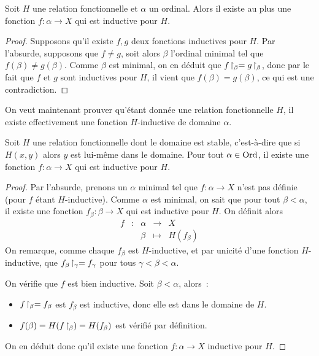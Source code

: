 \begin{lemma}
  Soit $H$ une relation fonctionnelle et $\alpha$ un ordinal. Alors il existe
  au plus une fonction $f : \alpha \to X$ qui est inductive pour $H$.
\end{lemma}

\begin{proof}
  Supposons qu'il existe $f,g$ deux fonctions inductives pour $H$. Par
  l'absurde, supposons que $f\neq g$, soit alors $\beta$ l'ordinal minimal tel
  que $f(\beta)\neq g(\beta)$. Comme $\beta$ est minimal, on en déduit que
  $f\!\upharpoonright_{\beta}=g\!\upharpoonright_{\beta}$, donc par le fait que $f$ et $g$ sont
  inductives pour $H$, il vient que $f(\beta) = g(\beta)$, ce qui est une
  contradiction.
\end{proof}

On veut maintenant prouver qu'étant donnée une relation fonctionnelle $H$,
il existe effectivement une fonction $H$-inductive de domaine $\alpha$.

\begin{lemma}
  Soit $H$ une relation fonctionnelle dont le domaine est stable, c'est-à-dire
  que si $H(x,y)$ alors $y$ est lui-même dans le domaine. Pour tout
  $\alpha \in \operatorname{Ord}$, il existe une fonction $f : \alpha \to X$ qui est inductive
  pour $H$.
\end{lemma}

\begin{proof}
  Par l'absurde, prenons un $\alpha$ minimal tel que $f : \alpha \to X$ n'est
  pas définie (pour $f$ étant $H$-inductive). Comme $\alpha$ est minimal, on
  sait que pour tout $\beta < \alpha$, il existe une fonction
  $f_\beta :\beta\to X$ qui est inductive pour $H$. On définit alors
  \[\begin{array}{ccccc}
  f & : & \alpha & \longrightarrow & X\\
  & & \beta & \longmapsto & H(f_\beta)
  \end{array}\]
  On remarque, comme chaque $f_\beta$ est $H$-inductive, et par unicité d'une
  fonction $H$-inductive, que $f_\beta\!\upharpoonright_{\gamma} = f_\gamma$ pour tous
  $\gamma < \beta < \alpha$.

  On vérifie que $f$ est bien inductive. Soit $\beta < \alpha$, alors~:
  \begin{itemize}
  \item $f\!\upharpoonright_{\beta} = f_\beta$ est $f_\beta$ est inductive, donc elle
    est dans le domaine de $H$.
  \item $f(\beta) = H(f\!\upharpoonright_{\beta}) = H(f_\beta)$ est vérifié par définition.
  \end{itemize}

  On en déduit donc qu'il existe une fonction $f : \alpha \to X$ inductive pour
  $H$.
\end{proof}

